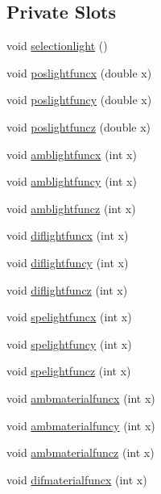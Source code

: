 \subsection*{Private Slots}
\begin{DoxyCompactItemize}
\item 
void \hyperlink{class_mondock_a25391f1fac7a8a46e761f2f8c9c2fdc8}{selectionlight} ()
\item 
void \hyperlink{class_mondock_a05ec25870c70f2eeba2ccdc1da44e7ca}{poslightfuncx} (double x)
\item 
void \hyperlink{class_mondock_ae8593b3cbc4c42badf600599a2e01dce}{poslightfuncy} (double x)
\item 
void \hyperlink{class_mondock_aa5ec8a8453515216ffd85961c868108f}{poslightfuncz} (double x)
\item 
void \hyperlink{class_mondock_a07685bc7db5c3346c1813e84abf8aa2f}{amblightfuncx} (int x)
\item 
void \hyperlink{class_mondock_a2397e94ee9af0a37c12b1443d70c17b6}{amblightfuncy} (int x)
\item 
void \hyperlink{class_mondock_a727e012b9b0df615ea2d585f98b00fb9}{amblightfuncz} (int x)
\item 
void \hyperlink{class_mondock_ad475a793b9d77352f2e844b22315612e}{diflightfuncx} (int x)
\item 
void \hyperlink{class_mondock_a5e60c8e141570f171d420de6f6e9af54}{diflightfuncy} (int x)
\item 
void \hyperlink{class_mondock_a4fd34f4035885b71a4d914ff85496715}{diflightfuncz} (int x)
\item 
void \hyperlink{class_mondock_ad12c449ba7b08f8430353e5fb7687e6a}{spelightfuncx} (int x)
\item 
void \hyperlink{class_mondock_ac2c735aede2c4c621f08f9c34d6a4c9c}{spelightfuncy} (int x)
\item 
void \hyperlink{class_mondock_ad626e2142ce5065af9a3bd891c825a5a}{spelightfuncz} (int x)
\item 
void \hyperlink{class_mondock_a8311bcb6b47314eba3966861c6cfe53a}{ambmaterialfuncx} (int x)
\item 
void \hyperlink{class_mondock_abab8b7116db8f4d8a45f97bbccfea28a}{ambmaterialfuncy} (int x)
\item 
void \hyperlink{class_mondock_aef75cf8b1bb4a9cf7e6f6a04ac9a6e53}{ambmaterialfuncz} (int x)
\item 
void \hyperlink{class_mondock_ab52fa4e602f9dd7686b4beaee1ae78a7}{difmaterialfuncx} (int x)
\item 

\end{DoxyCompactItemize}
